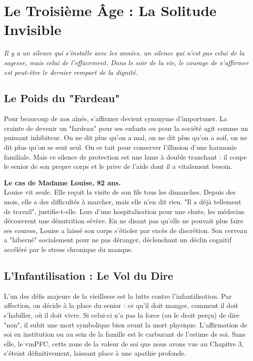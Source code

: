 \chapter{Le Troisième Âge : La Solitude Invisible}

\textit{Il y a un silence qui s'installe avec les années, un silence qui n'est pas celui de la sagesse, mais celui de l'effacement. Dans le soir de la vie, le courage de s'affirmer est peut-être le dernier rempart de la dignité.}

\section{Le Poids du "Fardeau"}
Pour beaucoup de nos aînés, s'affirmer devient synonyme d'importuner. La crainte de devenir un "fardeau" pour ses enfants ou pour la société agit comme un puissant inhibiteur. On ne dit plus qu'on a mal, on ne dit plus qu'on a soif, on ne dit plus qu'on se sent seul. On se tait pour conserver l'illusion d'une harmonie familiale. Mais ce silence de protection est une lame à double tranchant : il coupe le senior de son propre corps et le prive de l'aide dont il a vitalement besoin.

\begin{NoteClinique}
\textbf{Le cas de Madame Louise, 82 ans.} \\
Louise vit seule. Elle reçoit la visite de son fils tous les dimanches. Depuis des mois, elle a des difficultés à marcher, mais elle n'en dit rien. "Il a déjà tellement de travail", justifie-t-elle. Lors d'une hospitalisation pour une chute, les médecins découvrent une dénutrition sévère. En ne disant pas qu'elle ne pouvait plus faire ses courses, Louise a laissé son corps s'étioler par excès de discrétion. Son cerveau a "hiberné" socialement pour ne pas déranger, déclenchant un déclin cognitif accéléré par le stress chronique du manque.
\end{NoteClinique}

\section{L'Infantilisation : Le Vol du Dire}
L'un des défis majeurs de la vieillesse est la lutte contre l'infantilisation. Par affection, on décide à la place du senior : ce qu'il doit manger, comment il doit s'habiller, où il doit vivre. Si celui-ci n'a pas la force (ou le droit perçu) de dire "non", il subit une mort symbolique bien avant la mort physique. L'affirmation de soi en institution ou au sein de la famille est le carburant de l'estime de soi. Sans elle, le vmPFC, cette zone de la valeur de soi que nous avons vue au Chapitre 3, s'éteint définitivement, laissant place à une apathie profonde.

